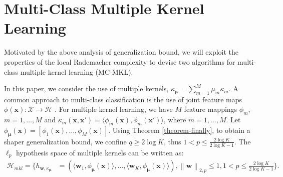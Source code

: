 \documentclass{article}
\begin{document}
\section{Multi-Class Multiple Kernel Learning}
Motivated by the above analysis of generalization bound,
we will exploit the properties of the local Rademacher complexity
to devise two algorithms for multi-class multiple kernel learning (MC-MKL).

In this paper, we consider the use of multiple kernels,
$\kappa_{\bm \mu}=\sum_{m=1}^M \mu_m\kappa_m.$
A common approach to multi-class classification is the use of joint feature
maps $\phi(\mathbf x):\mathcal X \to \mathcal H$ \cite{TsochantaridisHJA04}.
For multiple kernel learning, we have $M$ feature mappings $\phi_m$, $m=1,\ldots,M$ and
$\kappa_m(\mathbf x,\mathbf x')=\langle \phi_m(\mathbf x), \phi_m(\mathbf x')\rangle$,
where $m=1,\ldots,M$.
Let $\phi_{\bm \mu}(\mathbf x)=[\phi_1(\mathbf x),\ldots,\phi_M(\mathbf x)]$.
Using Theorem \ref{theorem-finally}, to obtain a shaper generalization bound,
we confine $q \geq 2\log K$, thus $1 < p \leq \frac{2\log K}{2\log K-1}$.
The $\ell_p$ hypothesis space of multiple kernels can be written as:
 \begin{align*}
 \label{hypothspapcemkl}
   \mathcal{H}_{mkl}=\Big\{h_{\mathbf{w},\kappa_{\bm \mu}}&=\left(\langle \mathbf w_1,\phi_{\bm \mu}(\mathbf x)\rangle,\ldots, \langle\mathbf w_K,\phi_{\bm \mu}(\mathbf x)\rangle\right),
   \left\|\mathbf  w \right\|_{2,p}\leq 1, 1 < p \leq \frac{2\log K}{2\log K-1}
  \Big\}.
 \end{align*}

\end{document}
